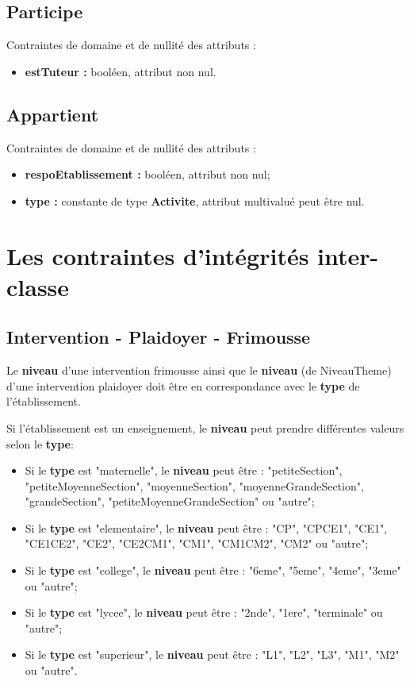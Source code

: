 \documentclass[asi, sansVersion]{picInsa}
\begin{document}
\subsection*{Participe}
Contraintes de domaine et de nullité des attributs :
\begin{itemize}
	\item \textbf{estTuteur :} booléen, attribut non nul.\\
\end{itemize}

\subsection*{Appartient}
Contraintes de domaine et de nullité des attributs :
\begin{itemize}
	\item \textbf{respoEtablissement :} booléen, attribut non nul;
	\item \textbf{type :} constante de type \textbf{Activite}, attribut multivalué peut être nul.
\end{itemize}


\section{Les contraintes d'intégrités inter-classe}


\subsection*{Intervention - Plaidoyer - Frimousse}
Le \textbf{niveau} d'une intervention frimousse ainsi que le \textbf{niveau} (de NiveauTheme) d'une intervention plaidoyer doit être en correspondance avec le \textbf{type} de l'établissement.  

Si l'établissement est un enseignement, le \textbf{niveau} peut prendre différentes valeurs selon le \textbf{type}:
\begin{itemize}
\item Si le \textbf{type} est "maternelle", le \textbf{niveau} peut être : "petiteSection", "petiteMoyenneSection", "moyenneSection", "moyenneGrandeSection", "grandeSection", "petiteMoyenneGrandeSection" ou "autre";
\item Si le \textbf{type} est "elementaire", le \textbf{niveau} peut être : "CP", "CPCE1", "CE1", "CE1CE2", "CE2", "CE2CM1", "CM1", "CM1CM2", "CM2" ou "autre";
\item Si le \textbf{type} est "college", le \textbf{niveau} peut être : "6eme", "5eme", "4eme", "3eme" ou "autre";
\item Si le \textbf{type} est "lycee", le \textbf{niveau} peut être : "2nde", "1ere", "terminale" ou "autre";
\item Si le \textbf{type} est "superieur", le \textbf{niveau} peut être : "L1", "L2", "L3", "M1", "M2" ou "autre".
\end{itemize}
\end{document}
